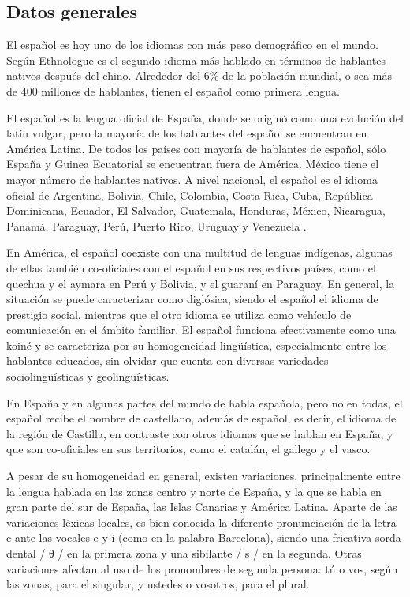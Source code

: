 \begin{multicols}{2}
\subsection{Datos generales}

El español es hoy uno de los idiomas con más peso demográfico en el mundo. Según Ethnologue \cite{ethnologue} es el segundo idioma más hablado en términos de hablantes nativos después del chino. Alrededor del 6\% de la población mundial, o sea más de 400 millones de hablantes, tienen el español como primera lengua.

El español es la lengua oficial de España, donde se originó como una evolución del latín vulgar, pero la mayoría de los hablantes del español se encuentran en América Latina. De todos los países con mayoría de hablantes de español, sólo España y Guinea Ecuatorial se encuentran fuera de América. México tiene el mayor número de hablantes nativos. A nivel nacional, el español es el idioma oficial de Argentina, Bolivia, Chile, Colombia, Costa Rica, Cuba, República Dominicana, Ecuador, El Salvador, Guatemala, Honduras, México, Nicaragua, Panamá, Paraguay, Perú, Puerto Rico, Uruguay y Venezuela \cite{atlasspanish}.

En América, el español coexiste con una multitud de lenguas indígenas, algunas de ellas también co-oficiales con el español en sus respectivos países, como el quechua y el aymara en Perú y Bolivia, y el guaraní en Paraguay. En general, la situación se puede caracterizar como diglósica, siendo el español el idioma de prestigio social, mientras que el otro idioma se utiliza como vehículo de comunicación en el ámbito familiar. El español funciona efectivamente como una koiné y se caracteriza por su homogeneidad lingüística, especialmente entre los hablantes educados, sin olvidar que cuenta con diversas variedades sociolingüísticas y geolingüísticas.

En España y en algunas partes del mundo de habla española, pero no en todas, el español recibe el nombre de castellano, además de español, es decir, el idioma de la región de Castilla, en contraste con otros idiomas que se hablan en España, y que son co-oficiales en sus territorios, como el catalán, el gallego y el vasco.

A pesar de su homogeneidad en general, existen variaciones, principalmente entre la lengua hablada en las zonas centro y norte de España, y la que se habla en gran parte del sur de España, las Islas Canarias y América Latina. Aparte de las variaciones léxicas locales, es bien conocida la diferente pronunciación de la letra c ante las vocales e y i (como en la palabra Barcelona), siendo una fricativa sorda dental / θ /  en la primera zona y una sibilante / s / en la segunda. Otras variaciones afectan al uso de los pronombres de segunda persona: tú o vos, según las zonas, para el singular, y ustedes o vosotros, para el plural.


\end{multicols}
